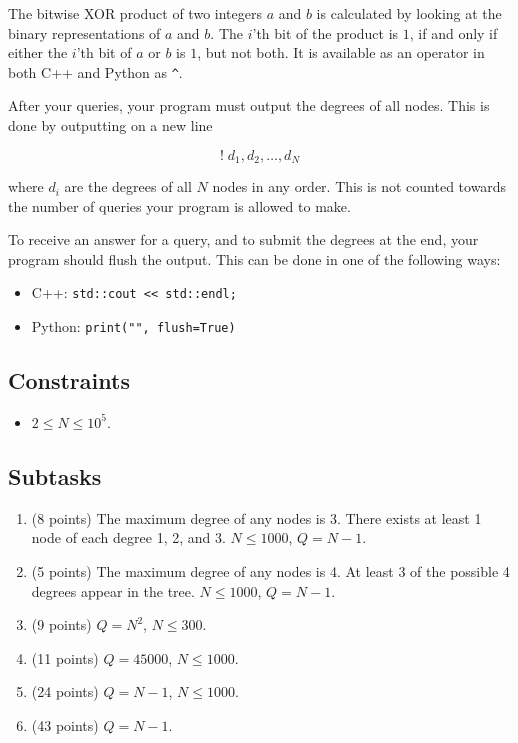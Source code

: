 The bitwise XOR product of two integers $a$ and $b$ is calculated by looking at the binary representations of $a$ and $b$.
The $i$'th bit of the product is $1$, if and only if either the $i$'th bit of $a$ or $b$ is $1$, but not both.
It is available as an operator in both C++ and Python as \texttt{\^{}}.

After your queries, your program must output the degrees of all nodes.
This is done by outputting on a new line

$$! \; d_1, d_2, \dots, d_N$$

where $d_i$ are the degrees of all $N$ nodes in any order.
This is not counted towards the number of queries your program is allowed to make.

To receive an answer for a query, and to submit the degrees at the end, your program should flush the output.
This can be done in one of the following ways:

\begin{itemize}
  \item C++: \texttt{std::cout << std::endl;}
  \item Python: \texttt{print("", flush=True)}
\end{itemize}

\subsection*{Constraints}

\begin{itemize}
  \item $2 \leq N \leq 10^5$.
\end{itemize}

\subsection*{Subtasks}

\begin{enumerate}
  \item (8 points) The maximum degree of any nodes is 3. There exists at least 1 node of each degree 1, 2, and 3. $N \leq 1000$, $Q = N - 1$.
  \item (5 points) The maximum degree of any nodes is 4. At least 3 of the possible 4 degrees appear in the tree. $N \leq 1000$, $Q = N - 1$.
  \item (9 points) $Q = N^2$, $N \leq 300$.
  \item (11 points) $Q = 45000$, $N \leq 1000$.
  \item (24 points) $Q = N - 1$, $N \leq 1000$.
  \item (43 points) $Q = N - 1$.
\end{enumerate}

